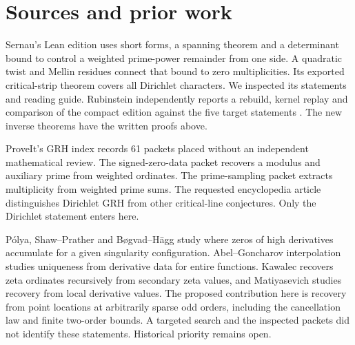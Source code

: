 \documentclass[11pt,letterpaper]{article}
\numberwithin{equation}{section}
\begin{document}
\section{Sources and prior work}
Sernau's Lean edition \cite{sernau} uses short forms, a spanning theorem
and a determinant bound to control a weighted prime-power remainder from
one side. A quadratic twist and Mellin residues connect that bound to
zero multiplicities. Its exported critical-strip theorem covers all
Dirichlet characters. We inspected its statements and reading guide.
Rubinstein independently reports a rebuild, kernel replay and comparison
of the compact edition against the five target statements \cite{rubinstein}.
The new inverse theorems have the written proofs above.

ProveIt's GRH index \cite{proveit} records 61 packets placed without an
independent mathematical review. The signed-zero-data packet recovers a
modulus and auxiliary prime from weighted ordinates. The prime-sampling
packet extracts multiplicity from weighted prime sums. The requested
encyclopedia article \cite{wiki} distinguishes Dirichlet GRH from other
critical-line conjectures. Only the Dirichlet statement enters here.

P\'olya, Shaw--Prather and B\o gvad--H\"agg \cite{polya,shaw,bogvad}
study where zeros of high derivatives accumulate for a given singularity
configuration. Abel--Goncharov interpolation \cite{popov} studies
uniqueness from derivative data for entire functions. Kawalec
\cite{kawalec} recovers zeta ordinates recursively from secondary zeta
values, and Matiyasevich \cite{mati} studies recovery from local derivative
values. The proposed contribution here is recovery from point locations
at arbitrarily sparse odd orders, including the cancellation law and
finite two-order bounds. A targeted search and the inspected packets did
not identify these statements. Historical priority remains open.
\end{document}
